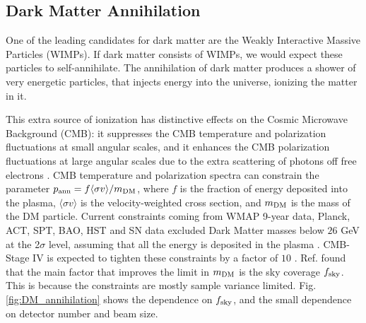 \subsection{Dark Matter Annihilation}

One of the leading candidates for dark matter are the Weakly Interactive Massive Particles (WIMPs). If dark matter consists of WIMPs, we would expect these particles to self-annihilate. The annihilation of dark matter produces a shower of very energetic particles, that injects energy into the universe, ionizing the matter in it.

This extra source of ionization has distinctive effects on the Cosmic Microwave Background (CMB): it suppresses the CMB temperature and polarization fluctuations at small angular scales, and it enhances the CMB polarization fluctuations at large angular scales due to the extra scattering of photons off free electrons \cite{Chen:2003gz,Padmanabhan:2005es}.
CMB temperature and polarization spectra can constrain the parameter
$p_{\rm ann}=f\langle\sigma v\rangle/m_{\rm DM}$, where $f$ is the fraction of energy
deposited into the plasma, $\langle\sigma v\rangle$ is the velocity-weighted
cross section, and $m_{\rm DM}$ is the mass of the DM particle.
Current constraints coming from WMAP 9-year data,
Planck, ACT, SPT, BAO, HST and SN data excluded
Dark Matter masses below $26$ GeV at the 2$\sigma$ level, assuming that
all the energy is deposited in the plasma \cite{Madhavacheril:2013cna}. CMB-Stage IV is expected to tighten these constraints by a factor of $10$ \cite{Wu:2014hta}. 
Ref. \cite{Wu:2014hta} found that the main factor that improves the limit in $m_{\rm DM}$ is the sky coverage $f_{\rm sky}$. This is because the constraints are mostly sample variance limited. Fig. \ref{fig:DM_annihilation} shows the dependence on $f_{\rm sky}$, and the small dependence on detector number and beam size.

